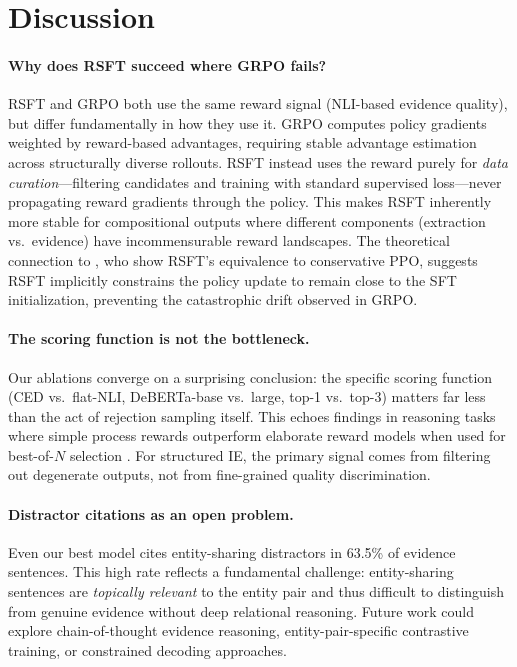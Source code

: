 \documentclass[11pt,a4paper]{article}
\begin{document}
\section{Discussion}
\label{sec:discussion}

\paragraph{Why does RSFT succeed where GRPO fails?}
RSFT and GRPO both use the same reward signal (NLI-based evidence quality), but differ fundamentally in how they use it.
GRPO computes policy gradients weighted by reward-based advantages, requiring stable advantage estimation across structurally diverse rollouts.
RSFT instead uses the reward purely for \emph{data curation}---filtering candidates and training with standard supervised loss---never propagating reward gradients through the policy.
This makes RSFT inherently more stable for compositional outputs where different components (extraction vs.\ evidence) have incommensurable reward landscapes.
The theoretical connection to \citet{tajwar2024preference}, who show RSFT's equivalence to conservative PPO, suggests RSFT implicitly constrains the policy update to remain close to the SFT initialization, preventing the catastrophic drift observed in GRPO.

\paragraph{The scoring function is not the bottleneck.}
Our ablations converge on a surprising conclusion: the specific scoring function (CED vs.\ flat-NLI, DeBERTa-base vs.\ large, top-1 vs.\ top-3) matters far less than the act of rejection sampling itself.
This echoes findings in reasoning tasks where simple process rewards outperform elaborate reward models when used for best-of-$N$ selection \citep{lightman2023lets}.
For structured IE, the primary signal comes from filtering out degenerate outputs, not from fine-grained quality discrimination.

\paragraph{Distractor citations as an open problem.}
Even our best model cites entity-sharing distractors in 63.5\% of evidence sentences.
This high rate reflects a fundamental challenge: entity-sharing sentences are \emph{topically relevant} to the entity pair and thus difficult to distinguish from genuine evidence without deep relational reasoning.
Future work could explore chain-of-thought evidence reasoning, entity-pair-specific contrastive training, or constrained decoding approaches.
\end{document}
